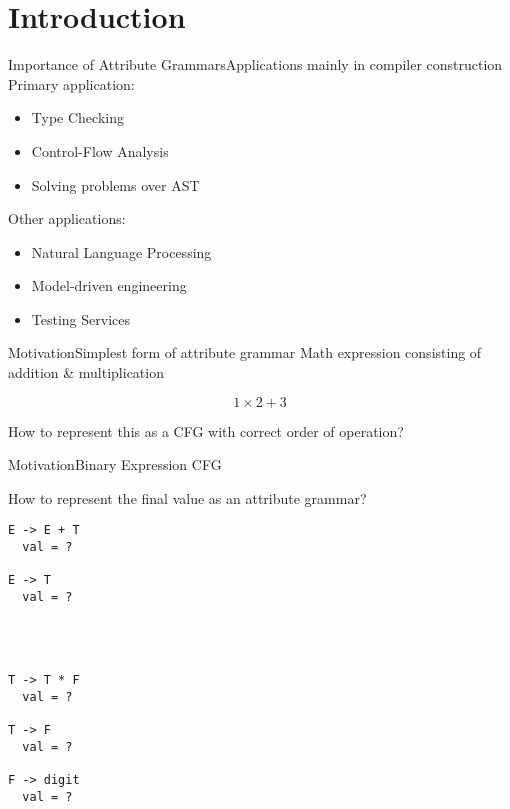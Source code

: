 \section{Introduction}

\begin{frame}{Importance of Attribute Grammars}{Applications mainly in compiler construction}
Primary application:

\begin{itemize}
    \item Type Checking
    \item Control-Flow Analysis
    \item Solving problems over AST
\end{itemize}

\emptyline

Other applications:
\begin{itemize}
    \item Natural Language Processing \cite{10.1007/978-3-642-25324-9_25}
    \item Model-driven engineering \cite{schone2020connecting}
    \item Testing Services \cite{habibisharif}
\end{itemize}
\end{frame}


\begin{frame}{Motivation}{Simplest form of attribute grammar}
Math expression consisting of addition \& multiplication

\[ 1 \times 2 + 3  \]

\newlinevspace

How to represent this as a \alert{CFG} with correct order of operation?
\end{frame}


\begin{frame}[fragile=singleslide]{Motivation}{Binary Expression CFG}

How to represent the \alert{final value} as an attribute grammar?

\begin{multicols}{2}
\begin{Verbatim}[fontsize=\small]
E -> E + T
  val = ?

E -> T
  val = ?




T -> T * F
  val = ?

T -> F
  val = ?

F -> digit
  val = ?
\end{Verbatim}
\end{multicols}
\end{frame}


